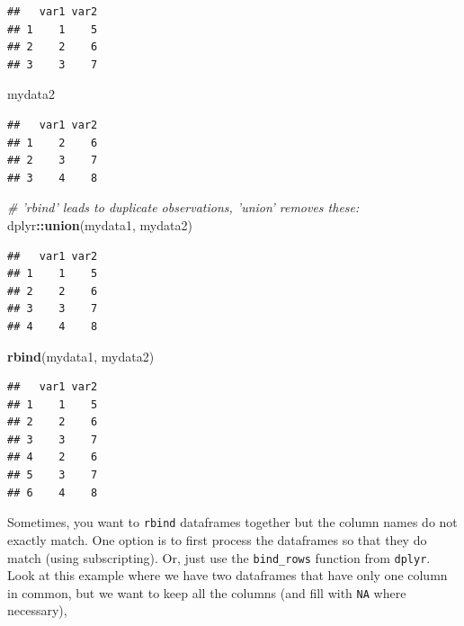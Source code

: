 \documentclass[]{book}
\newenvironment{Shaded}{\begin{snugshade}}{\end{snugshade}}
\newcommand{\CommentTok}[1]{\textcolor[rgb]{0.56,0.35,0.01}{\textit{#1}}}
\newcommand{\KeywordTok}[1]{\textcolor[rgb]{0.13,0.29,0.53}{\textbf{#1}}}
\newcommand{\NormalTok}[1]{#1}
\newcommand{\OperatorTok}[1]{\textcolor[rgb]{0.81,0.36,0.00}{\textbf{#1}}}
\begin{document}
\begin{verbatim}
##   var1 var2
## 1    1    5
## 2    2    6
## 3    3    7
\end{verbatim}

\begin{Shaded}
\begin{Highlighting}[]
\NormalTok{mydata2}
\end{Highlighting}
\end{Shaded}

\begin{verbatim}
##   var1 var2
## 1    2    6
## 2    3    7
## 3    4    8
\end{verbatim}

\begin{Shaded}
\begin{Highlighting}[]
\CommentTok{# 'rbind' leads to duplicate observations, 'union' removes these:}
\NormalTok{dplyr}\OperatorTok{::}\KeywordTok{union}\NormalTok{(mydata1, mydata2)}
\end{Highlighting}
\end{Shaded}

\begin{verbatim}
##   var1 var2
## 1    1    5
## 2    2    6
## 3    3    7
## 4    4    8
\end{verbatim}

\begin{Shaded}
\begin{Highlighting}[]
\KeywordTok{rbind}\NormalTok{(mydata1, mydata2)}
\end{Highlighting}
\end{Shaded}

\begin{verbatim}
##   var1 var2
## 1    1    5
## 2    2    6
## 3    3    7
## 4    2    6
## 5    3    7
## 6    4    8
\end{verbatim}

Sometimes, you want to \texttt{rbind} dataframes together but the column names do not exactly match. One option is to first process the dataframes so that they do match (using subscripting). Or, just use the \texttt{bind\_rows} function from \texttt{dplyr}. Look at this example where we have two dataframes that have only one column in common, but we want to keep all the columns (and fill with \texttt{NA} where necessary),
\end{document}
